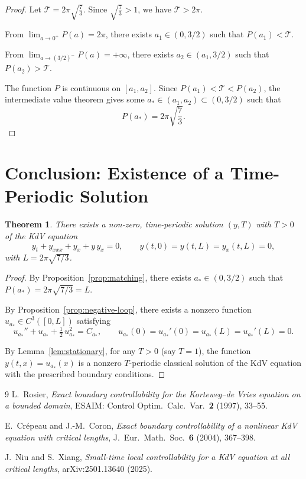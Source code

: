 \documentclass{article}
\newtheorem{theorem}[lemma]{Theorem}
\begin{document}
\begin{proof}
Let $\mathcal{T} = 2\pi\sqrt{\frac{7}{3}}$. Since $\sqrt{\frac{7}{3}} > 1$, we have $\mathcal{T} > 2\pi$.

From $\lim_{a \to 0^+} P(a) = 2\pi$, there exists $a_1 \in (0, 3/2)$ such that $P(a_1) < \mathcal{T}$.

From $\lim_{a \to (3/2)^-} P(a) = +\infty$, there exists $a_2 \in (a_1, 3/2)$ such that $P(a_2) > \mathcal{T}$.

The function $P$ is continuous on $[a_1, a_2]$. Since $P(a_1) < \mathcal{T} < P(a_2)$, the intermediate value theorem gives some $a_* \in (a_1, a_2) \subset (0, 3/2)$ such that
\[
P(a_*) = 2\pi\sqrt{\frac{7}{3}}.
\]
\end{proof}

\section{Conclusion: Existence of a Time-Periodic Solution}

\begin{theorem}\label{thm:main}
There exists a non-zero, time-periodic solution $(y, T)$ with $T > 0$ of the KdV equation
\[
y_t + y_{xxx} + y_x + y\,y_x = 0, \qquad y(t,0) = y(t,L) = y_x(t,L) = 0,
\]
with $L = 2\pi\sqrt{7/3}$.
\end{theorem}

\begin{proof}
By Proposition~\ref{prop:matching}, there exists $a_* \in (0, 3/2)$ such that $P(a_*) = 2\pi\sqrt{7/3} = L$.

By Proposition~\ref{prop:negative-loop}, there exists a nonzero function $u_{a_*} \in C^3([0, L])$ satisfying
\[
u_{a_*}'' + u_{a_*} + \tfrac{1}{2}\,u_{a_*}^2 = C_{a_*}, \qquad u_{a_*}(0) = u_{a_*}'(0) = u_{a_*}(L) = u_{a_*}'(L) = 0.
\]

By Lemma~\ref{lem:stationary}, for any $T > 0$ (say $T = 1$), the function $y(t,x) = u_{a_*}(x)$ is a nonzero $T$-periodic classical solution of the KdV equation with the prescribed boundary conditions.
\end{proof}

\begin{thebibliography}{9}
 L.~Rosier, \emph{Exact boundary controllability for the Korteweg--de Vries equation on a bounded domain}, ESAIM: Control Optim.\ Calc.\ Var.\ \textbf{2} (1997), 33--55.

 E.~Cr\'epeau and J.-M.~Coron, \emph{Exact boundary controllability of a nonlinear KdV equation with critical lengths}, J.\ Eur.\ Math.\ Soc.\ \textbf{6} (2004), 367--398.

 J.~Niu and S.~Xiang, \emph{Small-time local controllability for a KdV equation at all critical lengths}, arXiv:2501.13640 (2025).
\end{thebibliography}
\end{document}
